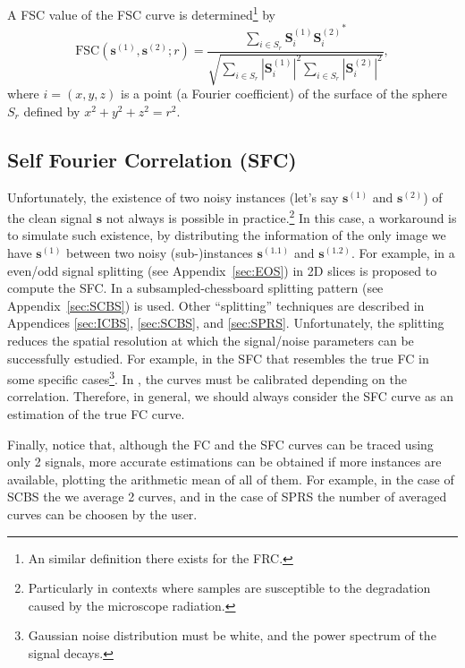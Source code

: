 \documentclass{article}
\begin{document}
A FSC value of the FSC curve is determined\footnote{An similar
  definition there exists for the FRC.} by~\cite{verbeke2024self}
\begin{equation}
\text{FSC}(\mathbf{s}^{(1)}, \mathbf{s}^{(2)}; r) = \frac{\sum_{i \in S_r} \mathbf{S}^{(1)}_i {\mathbf{S}^{(2)}_i}^*}{\sqrt{\sum_{i \in S_r} |\mathbf{S}^{(1)}_i|^2 \sum_{i \in S_r} |\mathbf{S}^{(2)}_i|^2}},
\end{equation}
where $i=(x, y, z)$ is a point (a Fourier coefficient) of the surface
of the sphere $S_r$ defined by $x^2+y^2+z^2=r^2$.

\subsection{Self Fourier Correlation (SFC)}

Unfortunately, the existence of two noisy instances (let's say
$\mathbf{s}^{(1)}$ and $\mathbf{s}^{(2)}$) of the clean signal
$\mathbf{s}$ not always is possible in practice.\footnote{Particularly
  in contexts where samples are susceptible to the degradation caused
  by the microscope radiation.} In this case, a workaround is to
simulate such existence, by distributing the information of the only
image we have $\mathbf{s}^{(1)}$ between two noisy (sub-)instances
$\mathbf{s}^{(1.1)}$ and $\mathbf{s}^{(1.2)}$. For example, in
\cite{verbeke2024self} a even/odd signal splitting (see
Appendix~\ref{sec:EOS}) in 2D slices is proposed to compute the
SFC. In \cite{koho2019fourier} a subsampled-chessboard splitting
pattern (see Appendix~\ref{sec:SCBS}) is used. Other ``splitting''
techniques are described in Appendices \ref{sec:ICBS}, \ref{sec:SCBS},
and \ref{sec:SPRS}. Unfortunately, the splitting reduces the spatial
resolution at which the signal/noise parameters can be successfully
estudied. For example, in \cite{verbeke2024self} the SFC that
resembles the true FC in some specific cases\footnote{Gaussian noise
  distribution must be white, and the power spectrum of the signal
  decays.}. In \cite{koho2019fourier}, the curves must be calibrated
depending on the correlation. Therefore, in general, we should always
consider the SFC curve as an estimation of the true FC curve.

Finally, notice that, although the FC and the SFC curves can be traced
using only 2 signals, more accurate estimations can be obtained if
more instances are available, plotting the arithmetic mean of all of
them. For example, in the case of SCBS the we average 2 curves, and in
the case of SPRS the number of averaged curves can be choosen by the
user.
\end{document}
